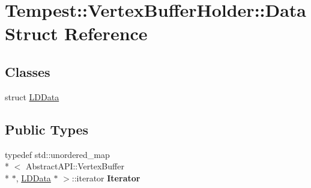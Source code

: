 \hypertarget{struct_vertex_buffer_holder_1_1_data}{\section{Tempest\+:\+:Vertex\+Buffer\+Holder\+:\+:Data Struct Reference}
\label{struct_vertex_buffer_holder_1_1_data}
}
\subsection*{Classes}
\begin{DoxyCompactItemize}
\item 
struct \hyperlink{struct_vertex_buffer_holder_1_1_data_1_1_l_d_data}{L\+D\+Data}
\end{DoxyCompactItemize}
\subsection*{Public Types}
\begin{DoxyCompactItemize}
\item 
\hypertarget{struct_vertex_buffer_holder_1_1_data_ada1ff4c2368f043aa670e337a34e8583}{typedef std\+::unordered\+\_\+map\\*
$<$ Abstract\+A\+P\+I\+::\+Vertex\+Buffer \\*
$\ast$, \hyperlink{struct_vertex_buffer_holder_1_1_data_1_1_l_d_data}{L\+D\+Data} $\ast$ $>$\+::iterator {\bfseries Iterator}}\label{struct_vertex_buffer_holder_1_1_data_ada1ff4c2368f043aa670e337a34e8583}

\end{DoxyCompactItemize}
